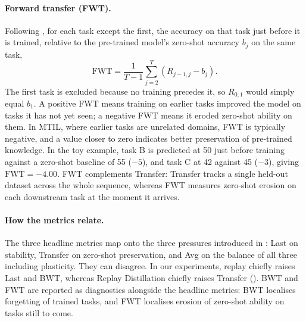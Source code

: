 \paragraph{Forward transfer (FWT).} Following \citet{lopezpaz2017gem}, for each task except the first, the accuracy on that task just before it is trained, relative to the pre-trained model's zero-shot accuracy $b_j$ on the same task,
\begin{equation}
\text{FWT} = \frac{1}{T-1}\sum_{j=2}^{T} \left(R_{j-1,j} - b_j\right).
\end{equation}
The first task is excluded because no training precedes it, so $R_{0,1}$ would simply equal $b_1$. A positive FWT means training on earlier tasks improved the model on tasks it has not yet seen; a negative FWT means it eroded zero-shot ability on them. In MTIL, where earlier tasks are unrelated domains, FWT is typically negative, and a value closer to zero indicates better preservation of pre-trained knowledge. In the toy example, task B is predicted at 50 just before training against a zero-shot baseline of 55 ($-5$), and task C at 42 against 45 ($-3$), giving $\text{FWT} = -4.00$. FWT complements Transfer: Transfer tracks a single held-out dataset across the whole sequence, whereas FWT measures zero-shot erosion on each downstream task at the moment it arrives.

\paragraph{How the metrics relate.} The three headline metrics map onto the three pressures introduced in : Last on stability, Transfer on zero-shot preservation, and Avg on the balance of all three including plasticity. They can disagree. In our experiments, replay chiefly raises Last and BWT, whereas Replay Distillation chiefly raises Transfer (). BWT and FWT are reported as diagnostics alongside the headline metrics: BWT localises forgetting of trained tasks, and FWT localises erosion of zero-shot ability on tasks still to come.

